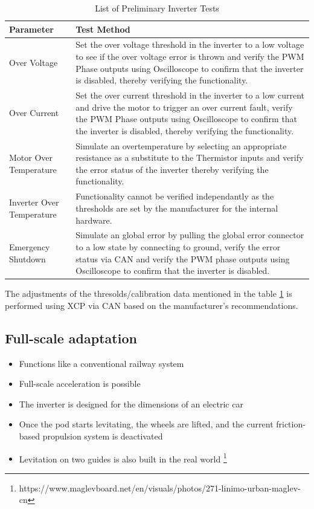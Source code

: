 \begin{table}[H]
    \centering
    \begin{adjustbox}{width=\textwidth}
    \begin{tabular}{|p{7.5cm}|p{10cm}|}
        \hline
        \textbf{Parameter} & \textbf{Test Method} \\
        \hline
        Over Voltage & Set the over voltage threshold in the inverter to a low voltage to see if the over voltage error is thrown and verify the PWM Phase outputs using Oscilloscope to confirm that the inverter is disabled, thereby verifying the functionality.\\
	\hline
	Over Current & Set the over current threshold in the inverter to a low current and drive the motor to trigger an over current fault, verify the PWM Phase outputs using Oscilloscope to confirm that the inverter is disabled, thereby verifying the functionality.\\
	\hline
	Motor Over Temperature &  Simulate an overtemperature by selecting an appropriate resistance as a substitute to the Thermistor inputs and verify the error status of the inverter thereby verifying the functionality.\\
	\hline
	Inverter Over Temperature & Functionality cannot be verified independantly as the thresholds are set by the manufacturer for the internal hardware.\\
         \hline
	Emergency Shutdown & Simulate an global error by pulling the global error connector to a low state by connecting to ground, verify the error status via CAN and verify the PWM phase outputs using Oscilloscope to confirm that the inverter is disabled.\\
	\hline
    \end{tabular}
    \end{adjustbox}
    \label{tab:preliminvtest}
    \caption{List of Preliminary Inverter Tests}
    
\end{table}

\noindent
The adjustments of the thresolds/calibration data mentioned in the table \ref{tab:preliminvtest} is performed using XCP via CAN based on the manufacturer's recommendations.
\subsection{Full-scale adaptation}
\begin{itemize}
  \item Functions like a conventional railway system
  \item Full-scale acceleration is possible
  \item The inverter is designed for the dimensions of an electric car
  \item Once the pod starts levitating, the wheels are lifted, and the current friction-based propulsion system is deactivated
  \item Levitation on two guides is also built in the real world \footnote{https://www.maglevboard.net/en/visuals/photos/271-linimo-urban-maglev-cn}
\end{itemize}

